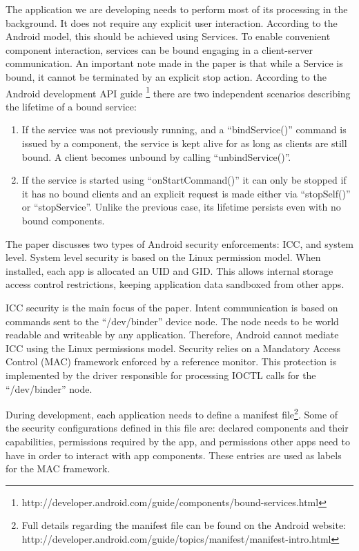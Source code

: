 The application we are developing needs to perform most of its processing in the background. It does not require any explicit user interaction. According to the Android model, this should be achieved using Services. To enable convenient component interaction, services can be bound engaging in a client-server communication. An important note made in the paper is that while a Service is bound, it cannot be terminated by an explicit stop action. According to the Android development API guide \footnote{http://developer.android.com/guide/components/bound-services.html} there are two independent scenarios describing the lifetime of a bound service:
\begin{enumerate}
	\item If the service was not previously running, and a ``bindService()'' command is issued by a component, the service is kept alive for as long as clients are still bound. A client becomes unbound by calling ``unbindService()''.
	
	\item If the service is started using ``onStartCommand()'' it can only be stopped if it has no bound clients and an explicit request is made either via ``stopSelf()'' or ``stopService''. Unlike the previous case, its lifetime persists even with no bound components.
\end{enumerate}


The paper discusses two types of Android security enforcements: ICC, and system level. System level security is based on the Linux permission model. When installed, each app is allocated an UID and GID. This allows internal storage access control restrictions, keeping application data sandboxed from other apps.

ICC security is the main focus of the paper. Intent communication is based on commands sent to the ``/dev/binder'' device node. The node needs to be world readable and writeable by any application. Therefore, Android cannot mediate ICC using the Linux permissions model. Security relies on a Mandatory Access Control (MAC) framework enforced by a reference monitor. This protection is implemented by the driver responsible for processing IOCTL calls for the ``/dev/binder'' node. 

During development, each application needs to define a manifest file\footnote{Full details regarding the manifest file can be found on the Android website: http://developer.android.com/guide/topics/manifest/manifest-intro.html}. Some of the security configurations defined in this file are: declared components and their capabilities, permissions required by the app, and permissions other apps need to have in order to interact with app components. These entries are used as labels for the MAC framework. 


